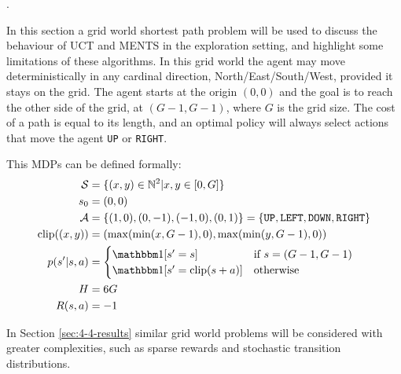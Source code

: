 \newcommand{\secfouronestate}{s^{(2,2)}}.

    In this section a grid world shortest path problem will be used to discuss the behaviour of UCT and MENTS in the exploration setting, and highlight some limitations of these algorithms. In this grid world the agent may move deterministically in any cardinal direction, North/East/South/West, provided it stays on the grid. The agent starts at the origin $(0,0)$ and the goal is to reach the other side of the grid, at $(G-1,G-1)$, where $G$ is the grid size. The cost of a path is equal to its length, and an optimal policy will always select actions that move the agent \texttt{UP} or \texttt{RIGHT}. 

    This MDPs can be defined formally:
    \begin{align}
        \cl{S} &= \{(x,y)\in\bb{N}^2 | x,y \in [0,G]\} \\
        s_0 &= (0,0) \\
        \cl{A} &= \{(1,0),(0,-1),(-1,0),(0,1)\} = \{\texttt{UP},\texttt{LEFT},\texttt{DOWN},\texttt{RIGHT}\} \\
        \text{clip}((x,y)) &= \left(\max(\min(x,G-1),0), \max(\min(y,G-1),0)\right) \\
        p(s'|s,a) &= \begin{cases}
            \one[s'=s] & \text{if } s=(G-1,G-1) \\
            \one[s'=\text{clip}(s+a)] & \text{otherwise}
        \end{cases} \\
        H &= 6G \\
        R(s,a) &= -1 
    \end{align}

    In Section \ref{sec:4-4-results} similar grid world problems will be considered with greater complexities, such as sparse rewards and stochastic transition distributions.

    
    
